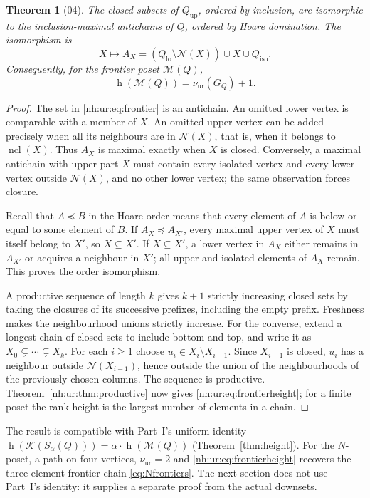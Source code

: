 \documentclass[11pt,a4paper]{article}
\newtheorem{theorem}{Theorem}[section]
\theoremstyle{definition}
\theoremstyle{remark}
\newcommand{\K}{\mathcal K}
\newcommand{\M}{\mathcal M}
\newcommand{\hgt}{\operatorname{h}}
\newcommand{\Qlo}{Q_{\mathrm{lo}}}
\newcommand{\Qup}{Q_{\mathrm{up}}}
\newcommand{\Qiso}{Q_{\mathrm{iso}}}
\newcommand{\Nb}{\mathcal N}
\newcommand{\nuur}{\nu_{\mathrm{ur}}}
\newcommand{\ncl}{\operatorname{ncl}}
\begin{document}
\begin{theorem}[04]\label{nh:ur:thm:frontiers}
The closed subsets of $\Qup$, ordered by inclusion, are isomorphic to the
inclusion-maximal antichains of $Q$, ordered by Hoare domination. The
isomorphism is
\begin{equation}\label{nh:ur:eq:frontier}
 X\longmapsto A_X=(\Qlo\setminus\Nb(X))\cup X\cup\Qiso.
\end{equation}
Consequently, for the frontier poset $\M(Q)$,
\begin{equation}\label{nh:ur:eq:frontierheight}
 \hgt(\M(Q))=\nuur(G_Q)+1.
\end{equation}
\end{theorem}
\begin{proof}
The set in \eqref{nh:ur:eq:frontier} is an antichain. An omitted lower vertex
is comparable with a member of $X$. An omitted upper vertex can be added
precisely when all its neighbours are in $\Nb(X)$, that is, when it belongs to
$\ncl(X)$. Thus $A_X$ is maximal exactly when $X$ is closed. Conversely, a
maximal antichain with upper part $X$ must contain every isolated vertex and
every lower vertex outside $\Nb(X)$, and no other lower vertex; the same
observation forces closure.

Recall that $A\preceq B$ in the Hoare order means that every element of $A$
is below or equal to some element of $B$. If $A_X\preceq A_{X'}$, every
maximal upper vertex of $X$ must itself belong to $X'$, so $X\subseteq X'$.
If $X\subseteq X'$, a lower vertex in $A_X$ either remains in $A_{X'}$ or
acquires a neighbour in $X'$; all upper and isolated elements of $A_X$
remain. This proves the order isomorphism.

A productive sequence of length $k$ gives $k+1$ strictly increasing closed sets
by taking the closures of its successive prefixes, including the empty prefix.
Freshness makes the neighbourhood unions strictly increase. For the converse,
extend a longest chain of closed sets to include bottom and top, and write it
as $X_0\subsetneq\cdots\subsetneq X_k$. For each $i\ge1$ choose
$u_i\in X_i\setminus X_{i-1}$. Since $X_{i-1}$ is closed, $u_i$ has a
neighbour outside $\Nb(X_{i-1})$, hence outside the union of the
neighbourhoods of the previously chosen columns. The sequence is productive.
Theorem~\ref{nh:ur:thm:productive} now gives
\eqref{nh:ur:eq:frontierheight}; for a finite poset the rank height is the
largest number of elements in a chain.
\end{proof}

The result is compatible with Part~I's uniform identity
$\hgt(\K(S_\alpha(Q)))=\alpha\cdot\hgt(\M(Q))$ (Theorem~\ref{thm:height}).
For the $N$-poset, a path on four vertices, $\nuur=2$ and
\eqref{nh:ur:eq:frontierheight} recovers the three-element frontier chain
\eqref{eq:Nfrontiers}. The next section does not use Part~I's identity: it
supplies a separate proof from the actual downsets.
\end{document}
